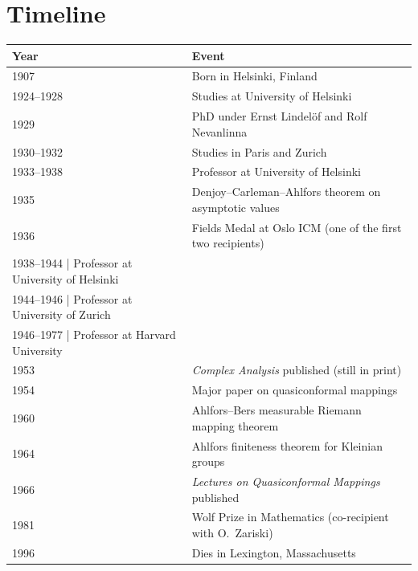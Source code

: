 \section*{Timeline}

\begin{tabularx}{\linewidth}{|p{1.5cm}|>{\raggedright\arraybackslash}X|}
\hline
\textbf{Year} & \textbf{Event} \\ \hline
1907 & Born in Helsinki, Finland \\ \hline
1924--1928 & Studies at University of Helsinki \\ \hline
1929 & PhD under Ernst Lindel\"{o}f and Rolf Nevanlinna \\ \hline
1930--1932 & Studies in Paris and Zurich \\ \hline
1933--1938 & Professor at University of Helsinki \\ \hline
1935 & Denjoy--Carleman--Ahlfors theorem on asymptotic values \\ \hline
1936 & Fields Medal at Oslo ICM (one of the first two recipients) \\ \hline
1938--1944 | Professor at University of Helsinki \\ \hline
1944--1946 | Professor at University of Zurich \\ \hline
1946--1977 | Professor at Harvard University \\ \hline
1953 & \textit{Complex Analysis} published (still in print) \\ \hline
1954 & Major paper on quasiconformal mappings \\ \hline
1960 & Ahlfors--Bers measurable Riemann mapping theorem \\ \hline
1964 & Ahlfors finiteness theorem for Kleinian groups \\ \hline
1966 & \textit{Lectures on Quasiconformal Mappings} published \\ \hline
1981 & Wolf Prize in Mathematics (co-recipient with O.\ Zariski) \\ \hline
1996 & Dies in Lexington, Massachusetts \\ \hline
\end{tabularx}
